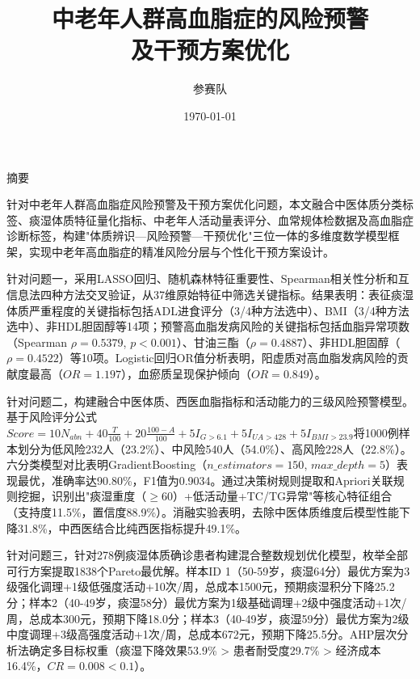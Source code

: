 \documentclass[12pt,a4paper]{ctexart}
\begin{document}
\title{\heiti\Huge 中老年人群高血脂症的风险预警\\及干预方案优化}
\author{\kaishu 参赛队}
\date{\today}

\maketitle
\thispagestyle{empty}

\newpage
\begin{center}
\heiti\Large 摘\quad 要
\end{center}

针对中老年人群高血脂症风险预警及干预方案优化问题，本文融合中医体质分类标签、痰湿体质特征量化指标、中老年人活动量表评分、血常规体检数据及高血脂症诊断标签，构建"体质辨识—风险预警—干预优化"三位一体的多维度数学模型框架，实现中老年高血脂症的精准风险分层与个性化干预方案设计。

针对问题一，采用LASSO回归、随机森林特征重要性、Spearman相关性分析和互信息法四种方法交叉验证，从37维原始特征中筛选关键指标。结果表明：表征痰湿体质严重程度的关键指标包括ADL进食评分（3/4种方法选中）、BMI（3/4种方法选中）、非HDL胆固醇等14项；预警高血脂发病风险的关键指标包括血脂异常项数（Spearman $\rho=0.5379$, $p<0.001$）、甘油三酯（$\rho=0.4887$）、非HDL胆固醇（$\rho=0.4522$）等10项。Logistic回归OR值分析表明，阳虚质对高血脂发病风险的贡献度最高（$OR=1.197$），血瘀质呈现保护倾向（$OR=0.849$）。

针对问题二，构建融合中医体质、西医血脂指标和活动能力的三级风险预警模型。基于风险评分公式$Score = 10N_{abn} + 40\frac{T}{100} + 20\frac{100-A}{100} + 5I_{G>6.1} + 5I_{UA>428} + 5I_{BMI>23.9}$将1000例样本划分为低风险232人（23.2\%）、中风险540人（54.0\%）、高风险228人（22.8\%）。六分类模型对比表明GradientBoosting（$n\_estimators=150$, $max\_depth=5$）表现最优，准确率达90.80\%，F1值为0.9034。通过决策树规则提取和Apriori关联规则挖掘，识别出"痰湿重度（$\geq 60$）+低活动量+TC/TG异常"等核心特征组合（支持度11.5\%，置信度88.9\%）。消融实验表明，去除中医体质维度后模型性能下降31.8\%，中西医结合比纯西医指标提升49.1\%。

针对问题三，针对278例痰湿体质确诊患者构建混合整数规划优化模型，枚举全部可行方案提取1838个Pareto最优解。样本ID 1（50-59岁，痰湿64分）最优方案为3级强化调理+1级低强度活动+10次/周，总成本1500元，预期痰湿积分下降25.2分；样本2（40-49岁，痰湿58分）最优方案为1级基础调理+2级中强度活动+1次/周，总成本300元，预期下降18.0分；样本3（40-49岁，痰湿59分）最优方案为2级中度调理+3级高强度活动+1次/周，总成本672元，预期下降25.5分。AHP层次分析法确定多目标权重（痰湿下降效果53.9\% > 患者耐受度29.7\% > 经济成本16.4\%，$CR=0.008<0.1$）。
\end{document}
